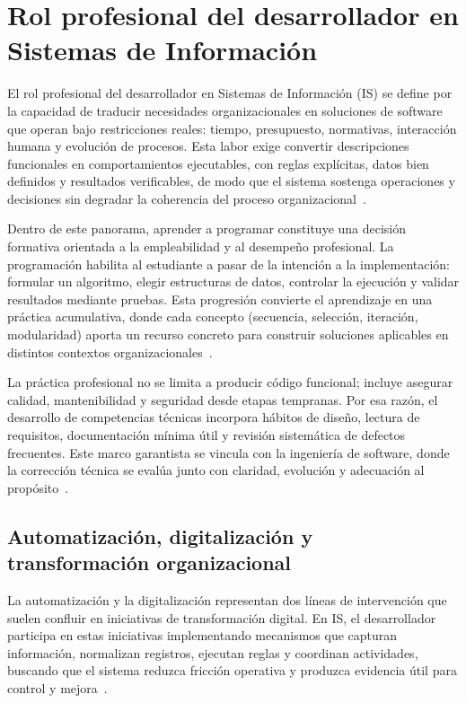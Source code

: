 \documentclass[12pt,twoside]{book}
\begin{document}
			\section{Rol profesional del desarrollador en Sistemas de Información}
				\noindent
				El rol profesional del desarrollador en Sistemas de Información (IS) se define por la capacidad de traducir necesidades organizacionales en soluciones de software que operan bajo restricciones reales: tiempo, presupuesto, normativas, interacción humana y evolución de procesos. Esta labor exige convertir descripciones funcionales en comportamientos ejecutables, con reglas explícitas, datos bien definidos y resultados verificables, de modo que el sistema sostenga operaciones y decisiones sin degradar la coherencia del proceso organizacional~\cite{Kendall2014Systems,Laudon2020Management,Tegarden2025Systems}.
				
				Dentro de este panorama, aprender a programar constituye una decisión formativa orientada a la empleabilidad y al desempeño profesional. La programación habilita al estudiante a pasar de la intención a la implementación: formular un algoritmo, elegir estructuras de datos, controlar la ejecución y validar resultados mediante pruebas. Esta progresión convierte el aprendizaje en una práctica acumulativa, donde cada concepto (secuencia, selección, iteración, modularidad) aporta un recurso concreto para construir soluciones aplicables en distintos contextos organizacionales~\cite{Hanly2015Problem,Gaddis2022Starting,Wirth1976Algorithms}.
				
				La práctica profesional no se limita a producir código funcional; incluye asegurar calidad, mantenibilidad y seguridad desde etapas tempranas. Por esa razón, el desarrollo de competencias técnicas incorpora hábitos de diseño, lectura de requisitos, documentación mínima útil y revisión sistemática de defectos frecuentes. Este marco garantista se vincula con la ingeniería de software, donde la corrección técnica se evalúa junto con claridad, evolución y adecuación al propósito~\cite{Ghezzi2003Fundamentals,Pressman2019Software,Sommerville2015Software}.
				
				\subsection{Automatización, digitalización y transformación organizacional}
					\noindent
					La automatización y la digitalización representan dos líneas de intervención que suelen confluir en iniciativas de transformación digital. En IS, el desarrollador participa en estas iniciativas implementando mecanismos que capturan información, normalizan registros, ejecutan reglas y coordinan actividades, buscando que el sistema reduzca fricción operativa y produzca evidencia útil para control y mejora~\cite{Laudon2020Management,Tegarden2025Systems,Cato2020Transforming}.
					
\end{document}
